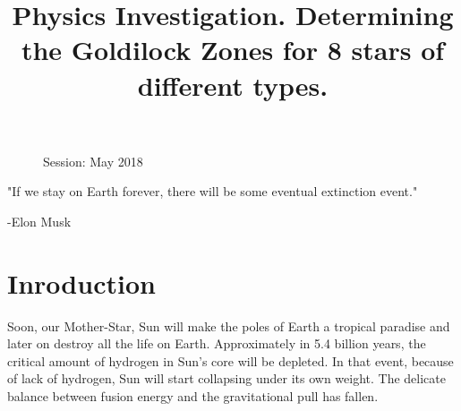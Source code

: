 \documentclass{article}
\title{Physics Investigation. Determining the Goldilock Zones for 8 stars of different types. }
\date{}
\author{}
\begin{document}
\maketitle

\onehalfspacing

\begin{figure}
  \begin{flushleft}
    Session: May 2018\\
    \end{flushleft}
  \end{figure}




\begin{center}
  "If we stay on Earth forever, there will be some eventual extinction event." 
\end{center}
\begin{flushright}
  -Elon Musk \cite{musk}
\end{flushright}


  



\section{Inroduction}

Soon, our Mother-Star, Sun will make the poles of Earth a tropical paradise and later on destroy all the life on Earth. Approximately in 5.4 billion years, the critical amount of hydrogen in Sun's core will be depleted. In that event, because of lack of hydrogen, Sun will start collapsing under its own weight. The delicate balance between fusion energy and the gravitational pull has fallen.\\
\end{document}
